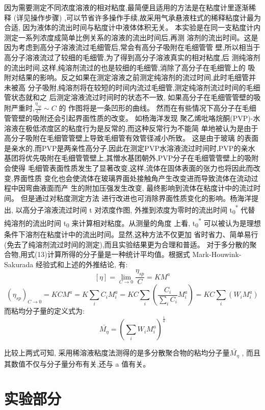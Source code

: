 \documentclass[11pt]{report}
\begin{document}
因为需要测定不同浓度溶液的相对粘度,最简便且适用的方法是在粘度计里逐渐稀释
(详见操作步骤)
 ,可以节省许多操作手续,故采用气承悬液柱式的稀释粘度计最为合适,
因为液体的流出时间与粘度计中液体体积无关。
本实验是在同一支粘度计内测定一系列浓度成简单比例关系的溶液的流出时间后,再测
溶剂的流出时间。这是因为考虑到高分子溶液流过毛细管后,常会有高分子吸附在毛细管管
壁,所以相当于高分子溶液流过了较细的毛细管,为了得到高分子溶液真实的相对粘度,后
测纯溶剂的流出时间,这样,纯溶剂流过的也是较细的毛细管,消除了高分子在毛细管上的
吸附对结果的影响。反之如果在测定溶液之前测定纯溶剂的流过时间,此时毛细管并未被高
分子吸附,纯溶剂将在较短的时间内流过毛细管,测定纯溶剂流过时间的毛细管状态就和之
后测定溶液流过时间时的状态不一致, 如果高分子在毛细管管壁的吸附严重时,\(\frac{\eta_{sp}}{C}\sim C\) 的
作图将是一条凹形的曲线。
然而在有些情况下高分子在毛细管管壁的吸附还会引起界面性质的改变。 如杨海洋发现
聚乙烯吡咯烷酮(PVP)-水溶液在极低浓度区的粘度行为是反常的,而这种反常行为不能简
单地被认为是由于高分子吸附在毛细管管壁上导致毛细管有效管径减小所致。 这是由于玻璃
的表面是亲水的,而PVP是两亲性高分子,因此在测定PVP水溶液流过时间时,PVP的亲水
基团将优先吸附在毛细管管壁上,其憎水基团朝外,PVP分子在毛细管管壁上的吸附会使得
毛细管表面性质发生了显著改变,这样,流体在固体表面的张力也将因此而改变,界面性质
变化也会使流体在玻璃界面处接触角产生改变进而导致流体在流动过程中因弯曲液面而产
生的附加压强发生改变, 最终影响到流体在粘度计中的流过时间。 但是通过对粘度测定方法
进行改进也可消除界面性质变化的影响。杨海洋提出, 以高分子溶液流过时间 t 对浓度作图,
外推到浓度为零时的流出时间 t\textsubscript{0}\textsuperscript{* } 代替纯溶剂的流出时间 t\textsubscript{0} 来计算相对粘度。从测量的角度
上看, t\textsubscript{0}\textsuperscript{* }可以被认为是理想条件下溶剂在粘度计中的流出时间。显然,这种方法不仅更加
省时省力、简单易行(免去了纯溶剂流过时间的测定),而且实验结果更为合理和普适。
对于多分散的聚合物,用式(13)计算所得的分子量是一种统计平均值。根据式 Mark-Houwink-Sakurada 经验式和上述的外推结论,
有:
\[
[\eta]=\lim_{C\to 0}\frac{\eta_{sp}}{C}=KM^{a}
\]
\[
\left(\eta_{sp}\right)_{C\to 0}=KCM^{a}=K\sum_{i}C_{i}M_{i}^{a}=KC\sum_{i}\left(\frac{C_{i}}{\sum_{i}C_{i}}M_{i}^{a}\right)=KC\sum_{i}\left(W_{i}M_{i}^{a}\right)
\]
而粘均分子量的定义式为:
\[
\bar{M_{\eta}}=\left(\sum_{i}W_{i}M_{i}^{a}\right)^{\frac{1}{a}}
\]

比较上两式可知, 采用稀溶液粘度法测得的是多分散聚合物的粘均分子量\(\bar{M_{\eta}}\) ,
而且其数值不仅与分子量分布有关,还与 a 值有关。


\part{实验部分}
\label{sec:orgf99b615}
\end{document}
